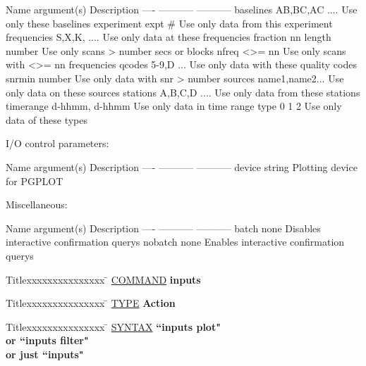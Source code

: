 \begin{list}{}{\setlength{\leftmargin}{0.5in}
     \setlength{\rightmargin}{0in}}
	Name		argument(s)	Description
	----		-----------     -----------
	baselines	AB,BC,AC ....	Use only these baselines
	experiment	expt #		Use only data from this experiment
	frequencies	S,X,K, ....	Use only data at these frequencies
	fraction	nn%
	length		number		Use only scans > number secs or blocks
	nfreq		<>= nn		Use only scans with <>= nn frequencies
	qcodes		5-9,D ...	Use only data with these quality codes
	snrmin		number		Use only data with snr > number
	sources		name1,name2...  Use only data on these sources
	stations	A,B,C,D ....	Use only data from these stations
	timerange	d-hhmm, d-hhmm	Use only data in time range
	type		0 1 2		Use only data of these types
\item
I/O control parameters:
\item
	Name	argument(s)	Description
	----	-----------     -----------
	device	string		Plotting device for PGPLOT
\item
Miscellaneous:
\item
	Name	argument(s)	Description
	----	-----------	-----------
	batch	none		Disables interactive confirmation querys
	nobatch	none		Enables interactive confirmation querys
\end{list}
\vspace{.2in}

\begin{tabbing}
Titlexxxxxxxxxxxxxxx \= \kill
\underline{COMMAND} \> {\bf 	inputs} \\
\end{tabbing}

\begin{tabbing}
Titlexxxxxxxxxxxxxxx \= \kill
\underline{TYPE} \> {\bf 		Action} \\
\end{tabbing}

\begin{tabbing}
Titlexxxxxxxxxxxxxxx \= \kill
\underline{SYNTAX} \> {\bf 		``inputs plot"} \\
\> {\bf 	    or  ``inputs filter"} \\
\> {\bf 	or just ``inputs"} \\
\end{tabbing}

